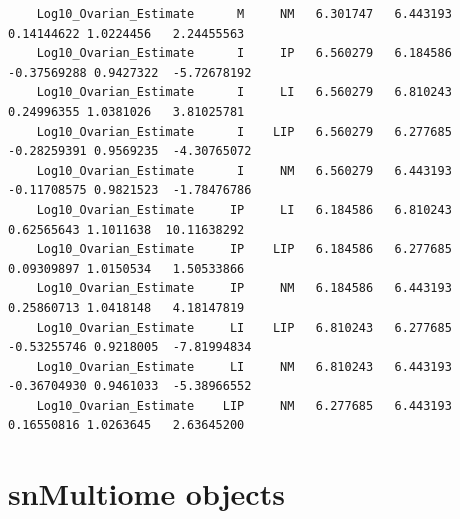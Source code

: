 \documentclass[
  landscape]{article}
\newenvironment{Shaded}{\begin{snugshade}}{\end{snugshade}}
\newcommand{\AttributeTok}[1]{\textcolor[rgb]{0.13,0.29,0.53}{#1}}
\newcommand{\CommentTok}[1]{\textcolor[rgb]{0.56,0.35,0.01}{\textit{#1}}}
\newcommand{\DecValTok}[1]{\textcolor[rgb]{0.00,0.00,0.81}{#1}}
\newcommand{\DocumentationTok}[1]{\textcolor[rgb]{0.56,0.35,0.01}{\textbf{\textit{#1}}}}
\newcommand{\FloatTok}[1]{\textcolor[rgb]{0.00,0.00,0.81}{#1}}
\newcommand{\FunctionTok}[1]{\textcolor[rgb]{0.13,0.29,0.53}{\textbf{#1}}}
\newcommand{\NormalTok}[1]{#1}
\newcommand{\OtherTok}[1]{\textcolor[rgb]{0.56,0.35,0.01}{#1}}
\newcommand{\SpecialCharTok}[1]{\textcolor[rgb]{0.81,0.36,0.00}{\textbf{#1}}}
\newcommand{\StringTok}[1]{\textcolor[rgb]{0.31,0.60,0.02}{#1}}
\begin{document}
\begin{verbatim}
    Log10_Ovarian_Estimate      M     NM   6.301747   6.443193   0.14144622 1.0224456   2.24455563
    Log10_Ovarian_Estimate      I     IP   6.560279   6.184586  -0.37569288 0.9427322  -5.72678192
    Log10_Ovarian_Estimate      I     LI   6.560279   6.810243   0.24996355 1.0381026   3.81025781
    Log10_Ovarian_Estimate      I    LIP   6.560279   6.277685  -0.28259391 0.9569235  -4.30765072
    Log10_Ovarian_Estimate      I     NM   6.560279   6.443193  -0.11708575 0.9821523  -1.78476786
    Log10_Ovarian_Estimate     IP     LI   6.184586   6.810243   0.62565643 1.1011638  10.11638292
    Log10_Ovarian_Estimate     IP    LIP   6.184586   6.277685   0.09309897 1.0150534   1.50533866
    Log10_Ovarian_Estimate     IP     NM   6.184586   6.443193   0.25860713 1.0418148   4.18147819
    Log10_Ovarian_Estimate     LI    LIP   6.810243   6.277685  -0.53255746 0.9218005  -7.81994834
    Log10_Ovarian_Estimate     LI     NM   6.810243   6.443193  -0.36704930 0.9461033  -5.38966552
    Log10_Ovarian_Estimate    LIP     NM   6.277685   6.443193   0.16550816 1.0263645   2.63645200
\end{verbatim}

\section{snMultiome objects}\label{snmultiome-objects}

\begin{Shaded}
\end{Shaded}
\end{document}
